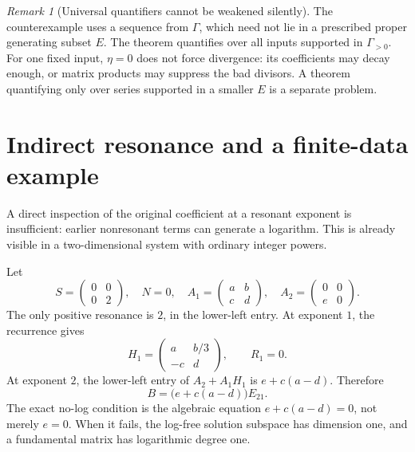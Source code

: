 \documentclass[11pt,a4paper]{article}
\numberwithin{equation}{section}
\theoremstyle{definition}
\theoremstyle{remark}
\newtheorem{remark}[theorem]{Remark}
\newcommand{\G}{\Gamma}
\begin{document}
\begin{remark}[Universal quantifiers cannot be weakened silently]
The counterexample uses a sequence from $\G$, which need not lie in a
prescribed proper generating subset $E$. The theorem quantifies over all
inputs supported in $\G_{>0}$. For one fixed input, $\eta=0$ does not
force divergence: its coefficients may decay enough, or matrix products
may suppress the bad divisors. A theorem quantifying only over series
supported in a smaller $E$ is a separate problem.
\end{remark}

\section{Indirect resonance and a finite-data example}
\label{sec:indirect}

A direct inspection of the original coefficient at a resonant exponent is
insufficient: earlier nonresonant terms can generate a logarithm. This is
already visible in a two-dimensional system with ordinary integer powers.

Let
\begin{equation}\label{eq:indirect-input}
 S=\begin{pmatrix}0&0\\0&2\end{pmatrix},\quad N=0,\quad
 A_1=\begin{pmatrix}a&b\\c&d\end{pmatrix},\quad
 A_2=\begin{pmatrix}0&0\\e&0\end{pmatrix}.
\end{equation}
The only positive resonance is $2$, in the lower-left entry. At exponent
$1$, the recurrence gives
\[
 H_1=\begin{pmatrix}a&b/3\\-c&d\end{pmatrix},\qquad R_1=0.
\]
At exponent $2$, the lower-left entry of $A_2+A_1H_1$ is
$e+c(a-d)$. Therefore
\begin{equation}\label{eq:indirect-B}
 B=\bigl(e+c(a-d)\bigr)E_{21}.
\end{equation}
The exact no-log condition is the algebraic equation
$e+c(a-d)=0$, not merely $e=0$. When it fails, the log-free solution
subspace has dimension one, and a fundamental matrix has logarithmic
degree one.
\end{document}
